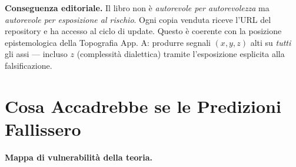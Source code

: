 \Proved{} \textbf{Conseguenza editoriale.} Il libro non è
\emph{autorevole per autorevolezza} ma \emph{autorevole per esposizione
al rischio}. Ogni copia venduta riceve l'URL del repository e ha accesso
al ciclo di update. Questo è coerente con la posizione epistemologica
della Topografia App. A: produrre segnali \((x, y, z)\) alti su
\emph{tutti} gli assi --- incluso \(z\) (complessità dialettica) tramite
l'esposizione esplicita alla falsificazione.



\section{Cosa Accadrebbe se le Predizioni
Fallissero}\label{cosa-accadrebbe-se-le-predizioni-fallissero}

\Hypoth{} \textbf{Mappa di vulnerabilità della teoria.}

